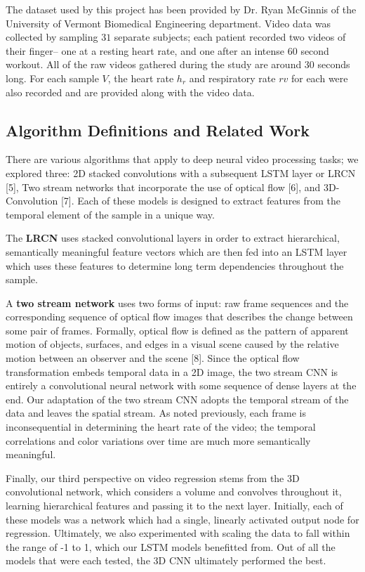 \documentclass{article}
\begin{document}
\noindent The dataset used by this project has been provided by Dr. Ryan McGinnis of the University of Vermont Biomedical Engineering department. Video data was collected by sampling $31$ separate subjects; each patient recorded two videos of their finger-- one at a resting heart rate, and one after an intense $60$ second workout. All of the raw videos gathered during the study are around 30 seconds long. For each sample $V$, the heart rate $h_{r}$ and respiratory rate $r{v}$ for each were also recorded and are provided along with the video data.

\subsection[2.2]{Algorithm Definitions and Related Work}
\noindent There are various algorithms that apply to deep neural video processing tasks; we explored three: 2D stacked convolutions with a subsequent LSTM layer or LRCN [5], Two stream networks that incorporate the use of optical flow [6], and 3D-Convolution [7]. Each of these models is designed to extract features from the temporal element of the sample in a unique way.

\noindent The \textbf{LRCN} uses stacked convolutional layers in order to extract hierarchical, semantically meaningful feature vectors which are then fed into an LSTM layer which uses these features to determine long term dependencies throughout the sample. 

\noindent A \textbf{two stream network} uses two forms of input: raw frame sequences and the corresponding sequence of optical flow images that describes the change between some pair of frames. Formally, optical flow is defined as the pattern of apparent motion of objects, surfaces, and edges in a visual scene caused by the relative motion between an observer and the scene [8]. Since the optical flow transformation embeds temporal data in a 2D image, the two stream CNN is entirely a convolutional neural network with some sequence of dense layers at the end. Our adaptation of the two stream CNN adopts the temporal stream of the data and leaves the spatial stream. As noted previously, each frame is inconsequential in determining the heart rate of the video; the temporal correlations and color variations over time are much more semantically meaningful.

Finally, our third perspective on video regression stems from the 3D convolutional network, which considers a volume and convolves throughout it, learning hierarchical features and passing it to the next layer. Initially, each of these models was a network which had a single, linearly activated output node for regression. Ultimately, we also experimented with scaling the data to fall within the range of -1 to 1, which our LSTM models benefitted from. Out of all the models that were each tested, the 3D CNN ultimately performed the best.
\end{document}

